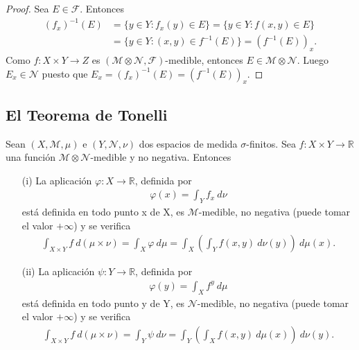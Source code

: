 \begin{proof}
    Sea $E \in \mathcal{F}$. Entonces
    \begin{align*}
        (f_x)^{-1}(E) & = \{ y \in Y : f_x(y) \in E \} = \{ y \in Y : f(x,y) \in E \} \\
                      & = \{ y \in Y : (x,y) \in f^{-1}(E) \} = (f^{-1}(E))_x.
    \end{align*}
    Como $f: X \times Y \longrightarrow Z$ es $(\mathcal{M} \otimes \mathcal{N}, \mathcal{F})$-medible, entonces $E \in \mathcal{M} \otimes \mathcal{N}$. Luego $E_x \in \mathcal{N}$ puesto que $E_x = (f_x)^{-1}(E) = (f^{-1}(E))_x$.
\end{proof}

\subsection{El Teorema de Tonelli}

\begin{teo}
    Sean $(X, \mathcal{M}, \mu)$ e $(Y, \mathcal{N}, \nu)$ dos espacios de medida $\sigma$-finitos. Sea $f: X \times Y \longrightarrow \mathbb{R}$ una función $\mathcal{M} \otimes \mathcal{N}$-medible y no negativa. Entonces
    \begin{enumerate}
        \item[(i)] La aplicación $\varphi: X \longrightarrow \mathbb{R}$, definida por
              \begin{align*}
                  \varphi(x) = \int_{Y}{f_x \ d\nu}
              \end{align*}
              está definida en todo punto x de X, es $\mathcal{M}$-medible, no negativa (puede tomar el valor $+\infty$) y se verifica
              \begin{align*}
                  \int_{X \times Y}{f \ d(\mu \times \nu)} = \int_{X}{\varphi \ d\mu} = \int_{X}\left( \int_{Y}{f(x,y) \ d\nu(y)}\right) \ d\mu(x).
              \end{align*}
        \item[(ii)] La aplicación $\psi: Y \longrightarrow \mathbb{R}$, definida por
              \begin{align*}
                  \varphi(y) = \int_{X}{f^y \ d\mu}
              \end{align*}
              está definida en todo punto y de Y, es $\mathcal{N}$-medible, no negativa (puede tomar el valor $+\infty$) y se verifica
              \begin{align*}
                  \int_{X \times Y}{f \ d(\mu \times \nu)} = \int_{Y}{\psi \ d\nu} = \int_{Y}\left( \int_{X}{f(x,y) \ d\mu(x)}\right) \ d\nu(y).
              \end{align*}
    \end{enumerate}
\end{teo}

